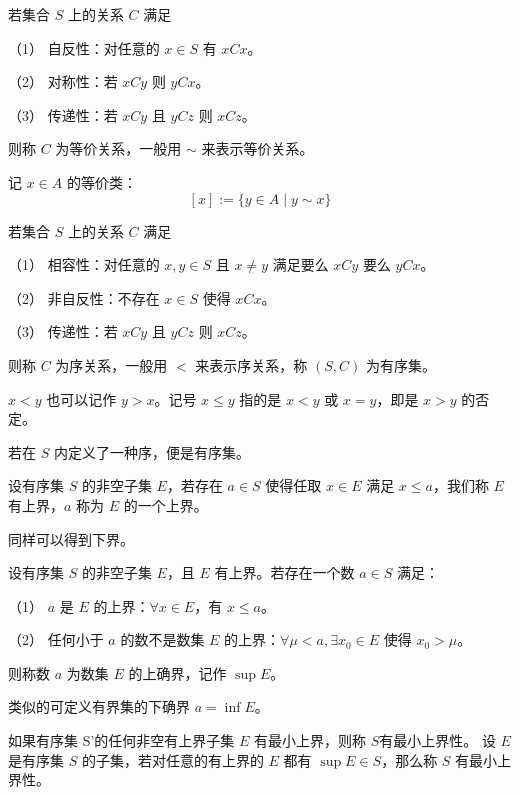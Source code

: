 \begin{definition}[等价关系]
	若集合 $S$ 上的关系 $C$ 满足

	（1） 自反性：对任意的 $x\in S$ 有 $xCx$。
	
	（2） 对称性：若 $xCy$ 则 $yCx$。

	（3） 传递性：若 $xCy$ 且 $yCz$ 则 $xCz$。

	则称 $C$ 为等价关系，一般用 $\sim$ 来表示等价关系。
\end{definition}

记 $x\in A$ 的等价类：
$$[x] := \{y \in A \mid y \sim x\}$$ 

\begin{definition}[序关系]
	若集合 $S$ 上的关系 $C$ 满足

	（1） 相容性：对任意的 $x,y\in S$ 且 $x\ne y$ 满足要么 $xCy$ 要么 $yCx$。
	
	（2） 非自反性：不存在 $x\in S$ 使得 $xCx$。

	（3） 传递性：若 $xCy$ 且 $yCz$ 则 $xCz$。

	则称 $C$ 为序关系，一般用 $<$ 来表示序关系，称 $(S,C)$ 为有序集。
\end{definition}

$x<y$ 也可以记作 $y>x$。记号 $x\leqslant y$ 指的是 $x<y$ 或 $x=y$，即是 $x>y$ 的否定。

若在 $S$ 内定义了一种序，便是有序集。

\begin{definition}[上界]
	设有序集 $S$ 的非空子集 $E$，若存在 $a \in S$ 使得任取 $x\in E$ 满足 $x \leqslant a$，我们称 $E$ 有上界，$a$ 称为 $E$ 的一个上界。 
\end{definition}

同样可以得到下界。

\begin{definition}[上确界]
	设有序集 $S$ 的非空子集 $E$，且 $E$ 有上界。若存在一个数 $a \in S$ 满足：
	
	（1） $a$ 是 $E$ 的上界：$\forall x\in E$，有 $x\leqslant a$。
	
	（2） 任何小于 $a$ 的数不是数集 $E$ 的上界：$\forall \mu<a, \exists x_0\in E$ 使得 $x_0>\mu$。
	
	则称数 $a$ 为数集 $E$ 的上确界，记作 $\sup E$。
\end{definition}

类似的可定义有界集的下确界 $a=\inf E$。

\begin{definition}[最小上界性]
	如果有序集 S'的任何非空有上界子集 $E$ 有最小上界，则称 $S$有最小上界性。
	设 $E$ 是有序集 $S$ 的子集，若对任意的有上界的 $E$ 都有 $\sup E \in S$，那么称 $S$ 有最小上界性。
\end{definition}

